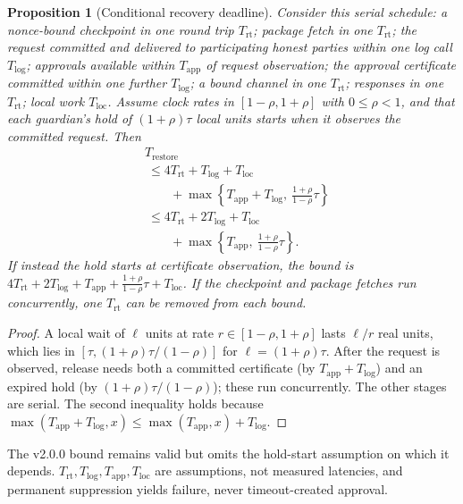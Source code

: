 \documentclass[pdflatex,sn-mathphys-num,twocolumn]{sn-jnl}
\theoremstyle{plain}
\newtheorem{proposition}[theorem]{Proposition}
\theoremstyle{definition}
\begin{document}
\begin{proposition}[Conditional recovery deadline]\label{prop:deadline}
Consider this serial schedule: a nonce-bound checkpoint in one round trip $T_{\mathrm{rt}}$; package fetch in one $T_{\mathrm{rt}}$; the request committed and delivered to participating honest parties within one log call $T_{\mathrm{log}}$; approvals available within $T_{\mathrm{app}}$ of request observation; the approval certificate committed within one further $T_{\mathrm{log}}$; a bound channel in one $T_{\mathrm{rt}}$; responses in one $T_{\mathrm{rt}}$; local work $T_{\mathrm{loc}}$. Assume clock rates in $[1-\rho,1+\rho]$ with $0\le\rho<1$, and that each guardian's hold of $(1+\rho)\tau$ local units starts when it observes the committed request. Then
\begin{equation}\label{eq:deadline}
\begin{split}
 &T_{\mathrm{restore}}\\
 &\ \le4T_{\mathrm{rt}}+T_{\mathrm{log}}+T_{\mathrm{loc}}\\
 &\qquad+\max\!\left\{T_{\mathrm{app}}+T_{\mathrm{log}},\ \tfrac{1+\rho}{1-\rho}\tau\right\}\\
 &\ \le4T_{\mathrm{rt}}+2T_{\mathrm{log}}+T_{\mathrm{loc}}\\
 &\qquad+\max\!\left\{T_{\mathrm{app}},\ \tfrac{1+\rho}{1-\rho}\tau\right\}.
\end{split}
\end{equation}
If instead the hold starts at certificate observation, the bound is $4T_{\mathrm{rt}}+2T_{\mathrm{log}}+T_{\mathrm{app}}+\frac{1+\rho}{1-\rho}\tau+T_{\mathrm{loc}}$. If the checkpoint and package fetches run concurrently, one $T_{\mathrm{rt}}$ can be removed from each bound.
\end{proposition}
\begin{proof}
A local wait of $\ell$ units at rate $r\in[1-\rho,1+\rho]$ lasts $\ell/r$ real units, which lies in $[\tau,(1+\rho)\tau/(1-\rho)]$ for $\ell=(1+\rho)\tau$. After the request is observed, release needs both a committed certificate (by $T_{\mathrm{app}}+T_{\mathrm{log}}$) and an expired hold (by $(1+\rho)\tau/(1-\rho)$); these run concurrently. The other stages are serial. The second inequality holds because $\max(T_{\mathrm{app}}+T_{\mathrm{log}},x)\le\max(T_{\mathrm{app}},x)+T_{\mathrm{log}}$.
\end{proof}

The v2.0.0 bound remains valid but omits the hold-start assumption on which it depends. $T_{\mathrm{rt}},T_{\mathrm{log}},T_{\mathrm{app}},T_{\mathrm{loc}}$ are assumptions, not measured latencies, and permanent suppression yields failure, never timeout-created approval.
\end{document}

